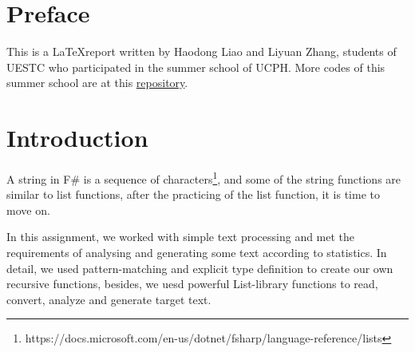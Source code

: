 \documentclass{article}
\begin{document}





\section{Preface}

This is a \LaTeX report written by Haodong Liao and Liyuan Zhang, students of UESTC who participated in the summer school of UCPH. More codes of this summer school are at this \href{https://github.com/Medill-East/ComputerScience/tree/master/Professional%20Core%20Courses/Functional%20Programming/SummerSchool}{repository}.

\section{Introduction}

A string in F\# is a sequence of characters\footnote[1]{https://docs.microsoft.com/en-us/dotnet/fsharp/language-reference/lists}, and some of the string functions are similar to list functions, after the practicing of the list function, it is time to move on.

In this assignment, we worked with simple text processing and met the requirements of analysing and generating some text according to statistics. In detail, we used pattern-matching and explicit type definition to create our own recursive functions, besides, we uesd powerful List-library functions to read, convert, analyze and generate target text.


\end{document}
